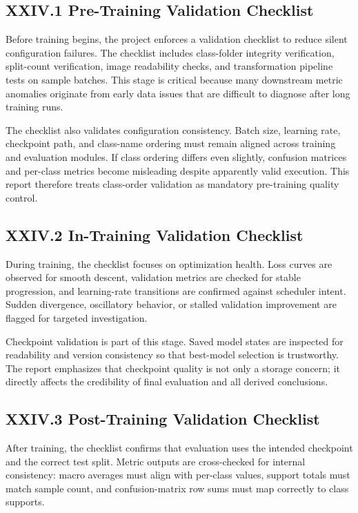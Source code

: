 \subsection*{XXIV.1 Pre-Training Validation Checklist}
Before training begins, the project enforces a validation checklist to reduce silent configuration failures. The checklist includes class-folder integrity verification, split-count verification, image readability checks, and transformation pipeline tests on sample batches. This stage is critical because many downstream metric anomalies originate from early data issues that are difficult to diagnose after long training runs.

The checklist also validates configuration consistency. Batch size, learning rate, checkpoint path, and class-name ordering must remain aligned across training and evaluation modules. If class ordering differs even slightly, confusion matrices and per-class metrics become misleading despite apparently valid execution. This report therefore treats class-order validation as mandatory pre-training quality control.

\subsection*{XXIV.2 In-Training Validation Checklist}
During training, the checklist focuses on optimization health. Loss curves are observed for smooth descent, validation metrics are checked for stable progression, and learning-rate transitions are confirmed against scheduler intent. Sudden divergence, oscillatory behavior, or stalled validation improvement are flagged for targeted investigation.

Checkpoint validation is part of this stage. Saved model states are inspected for readability and version consistency so that best-model selection is trustworthy. The report emphasizes that checkpoint quality is not only a storage concern; it directly affects the credibility of final evaluation and all derived conclusions.

\subsection*{XXIV.3 Post-Training Validation Checklist}
After training, the checklist confirms that evaluation uses the intended checkpoint and the correct test split. Metric outputs are cross-checked for internal consistency: macro averages must align with per-class values, support totals must match sample count, and confusion-matrix row sums must map correctly to class supports.

